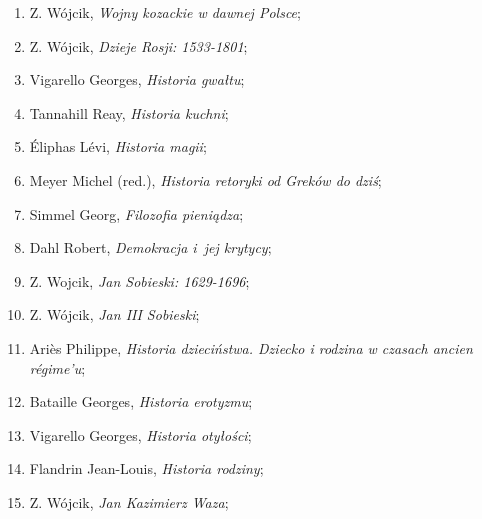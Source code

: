 \documentclass[a4paper,11pt]{article}
\begin{document}
\begin{enumerate}
\item Z. Wójcik, \textit{Wojny kozackie w dawnej Polsce};



\item Z. Wójcik, \textit{Dzieje Rosji: 1533-1801};



\item Vigarello Georges, \textit{Historia gwałtu};



\item Tannahill Reay, \textit{Historia kuchni};



\item Éliphas Lévi, \textit{Historia magii};



\item Meyer Michel (red.), \textit{Historia retoryki od Greków do dziś};



\item Simmel Georg, \textit{Filozofia pieniądza};



\item Dahl Robert, \textit{Demokracja i~jej krytycy};



\item Z. Wojcik, \textit{Jan Sobieski: 1629-1696};



\item Z. Wójcik, \textit{Jan III Sobieski};



\item Ariès Philippe, \textit{Historia dzieciństwa. Dziecko i rodzina w
    czasach ancien régime’u};



\item Bataille Georges, \textit{Historia erotyzmu};



\item Vigarello Georges, \textit{Historia otyłości};



\item Flandrin Jean-Louis, \textit{Historia rodziny};



\item Z. Wójcik, \textit{Jan Kazimierz Waza};




\end{enumerate}
\end{document}
